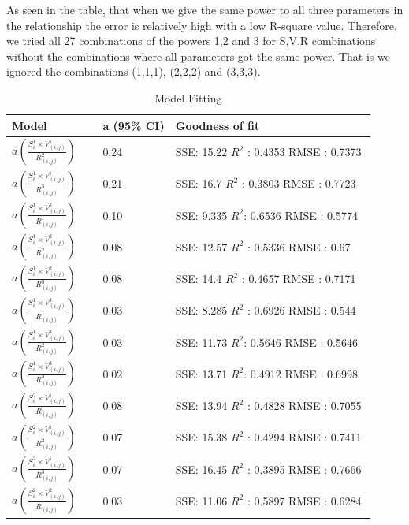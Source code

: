 \documentclass[conference]{IEEEtran}
\begin{document}
As seen in the table, that when we give the same power to all three parameters in the relationship the error is relatively high with a low R-square value. Therefore, we tried all 27 combinations of the powers 1,2 and 3 for S,V,R combinations without the combinations where all parameters got the same power. That is we ignored the combinations (1,1,1), (2,2,2) and (3,3,3).
\begin{center}
\begin{table}[htbp]
\caption{Model Fitting}
\begin{center}
\begin{adjustbox}{width=0.5\textwidth} 
\begin{tabular}{|p{0.25\linewidth}|p{0.2\linewidth}|p{0.55\linewidth}|} 
\hline
Model & a (95\% CI) & Goodness of fit\\
\hline
 $a(  \frac{S_{i}^1 \times V_{(i,j)}^1}{R_{(i,j)}^2})$ & 0.24 &  SSE: 15.22   $R^2$ : 0.4353  RMSE : 0.7373\\
\hline
 $a(  \frac{S_{i}^1 \times V_{(i,j)}^1}{R_{(i,j)}^3}) $ & 0.21 & SSE: 16.7  $R^2$ : 0.3803  RMSE : 0.7723 \\
\hline
 $a(  \frac{S_{i}^1 \times V_{(i,j)}^2}{R_{(i,j)}^1})$ & 0.10 & SSE: 9.335 $R^2$: 0.6536  RMSE : 0.5774 \\
\hline
$a(  \frac{S_{i}^1 \times V_{(i,j)}^2}{R_{(i,j)}^2})$ & 0.08 & SSE: 12.57  $R^2$ : 0.5336  RMSE : 0.67 \\
\hline
$a(  \frac{S_{i}^1 \times V_{(i,j)}^2}{R_{(i,j)}^3})$ & 0.08 &   SSE: 14.4  $R^2$ : 0.4657  RMSE : 0.7171\\
\hline
$a(  \frac{S_{i}^1 \times V_{(i,j)}^3}{R_{(i,j)}^1})$ & 0.03 & SSE: 8.285  $R^2$ : 0.6926  RMSE : 0.544 \\
\hline
$a(  \frac{S_{i}^1 \times V_{(i,j)}^3}{R_{(i,j)}^2})$ & 0.03 & SSE: 11.73  $R^2$: 0.5646  RMSE : 0.5646 \\
\hline
 $a(  \frac{S_{i}^1 \times V_{(i,j)}^3}{R_{(i,j)}^3})$ & 0.02 &  SSE: 13.71  $R^2$: 0.4912  RMSE : 0.6998 \\
\hline
 $a(  \frac{S_{i}^2 \times V_{(i,j)}^1}{R_{(i,j)}^1})$ & 0.08 &  SSE: 13.94  $R^2$ : 0.4828  RMSE : 0.7055 \\
\hline
 $a(  \frac{S_{i}^2 \times V_{(i,j)}^1}{R_{(i,j)}^2})$ & 0.07 & SSE: 15.38  $R^2$ : 0.4294 RMSE : 0.7411  \\
\hline
$a(  \frac{S_{i}^2 \times V_{(i,j)}^1}{R_{(i,j)}^3})$ & 0.07 &  SSE: 16.45  $R^2$ : 0.3895 RMSE : 0.7666  \\
\hline
 $a(  \frac{S_{i}^2 \times V_{(i,j)}^2}{R_{(i,j)}^1})$ & 0.03 & SSE: 11.06  $R^2$ : 0.5897  RMSE : 0.6284 \\

\end{tabular}
\end{adjustbox}
\end{center}
\end{table}
\end{center}
\end{document}
